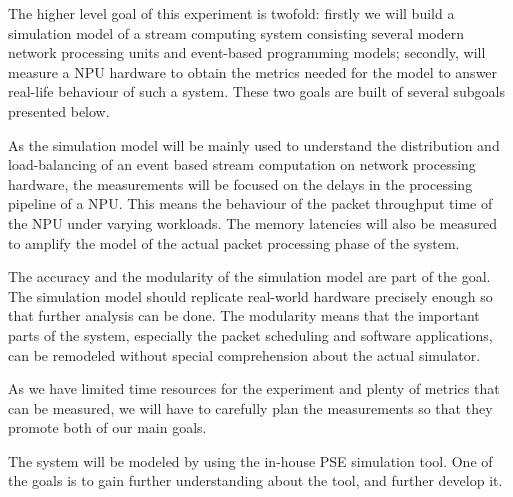 The higher level goal of this experiment is twofold: firstly we will build a simulation model of a stream computing system consisting several modern network processing units and event-based programming models; secondly, will measure a NPU hardware to obtain the metrics needed for the model to answer real-life behaviour of such a system. These two goals are built of several subgoals presented below.

As the simulation model will be mainly used to understand the distribution and load-balancing of an event based stream computation on network processing hardware, the measurements will be focused on the delays in the processing pipeline of a NPU. This means the behaviour of the packet throughput time of the NPU under varying workloads. The memory latencies will also be measured to amplify the model of the actual packet processing phase of the system.

The accuracy and the modularity of the simulation model are part of the goal. The simulation model should replicate real-world hardware precisely enough so that further analysis can be done. The modularity means that the important parts of the system, especially the packet scheduling and software applications, can be remodeled without special comprehension about the actual simulator.

As we have limited time resources for the experiment and plenty of metrics that can be measured, we will have to carefully plan the measurements so that they promote both of our main goals.

The system will be modeled by using the in-house PSE simulation tool. One of the goals is to gain further understanding about the tool, and further develop it.

